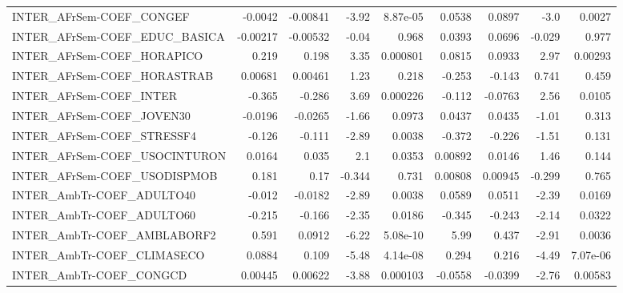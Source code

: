\begin{tabular}{lrrrrrrrr}
INTER\_AFrSem-COEF\_CONGEF              &     -0.0042 &     -0.00841 &    -3.92 & 8.87e-05 &     0.0538 &      0.0897 &         -3.0 &        0.0027 \\
INTER\_AFrSem-COEF\_EDUC\_BASICA         &    -0.00217 &     -0.00532 &    -0.04 &    0.968 &     0.0393 &      0.0696 &       -0.029 &         0.977 \\
INTER\_AFrSem-COEF\_HORAPICO            &       0.219 &        0.198 &     3.35 & 0.000801 &     0.0815 &      0.0933 &         2.97 &       0.00293 \\
INTER\_AFrSem-COEF\_HORASTRAB           &     0.00681 &      0.00461 &     1.23 &    0.218 &     -0.253 &      -0.143 &        0.741 &         0.459 \\
INTER\_AFrSem-COEF\_INTER               &      -0.365 &       -0.286 &     3.69 & 0.000226 &     -0.112 &     -0.0763 &         2.56 &        0.0105 \\
INTER\_AFrSem-COEF\_JOVEN30             &     -0.0196 &      -0.0265 &    -1.66 &   0.0973 &     0.0437 &      0.0435 &        -1.01 &         0.313 \\
INTER\_AFrSem-COEF\_STRESSF4            &      -0.126 &       -0.111 &    -2.89 &   0.0038 &     -0.372 &      -0.226 &        -1.51 &         0.131 \\
INTER\_AFrSem-COEF\_USOCINTURON         &      0.0164 &        0.035 &      2.1 &   0.0353 &    0.00892 &      0.0146 &         1.46 &         0.144 \\
INTER\_AFrSem-COEF\_USODISPMOB          &       0.181 &         0.17 &   -0.344 &    0.731 &    0.00808 &     0.00945 &       -0.299 &         0.765 \\
INTER\_AmbTr-COEF\_ADULTO40             &      -0.012 &      -0.0182 &    -2.89 &   0.0038 &     0.0589 &      0.0511 &        -2.39 &        0.0169 \\
INTER\_AmbTr-COEF\_ADULTO60             &      -0.215 &       -0.166 &    -2.35 &   0.0186 &     -0.345 &      -0.243 &        -2.14 &        0.0322 \\
INTER\_AmbTr-COEF\_AMBLABORF2           &       0.591 &       0.0912 &    -6.22 & 5.08e-10 &       5.99 &       0.437 &        -2.91 &        0.0036 \\
INTER\_AmbTr-COEF\_CLIMASECO            &      0.0884 &        0.109 &    -5.48 & 4.14e-08 &      0.294 &       0.216 &        -4.49 &      7.07e-06 \\
INTER\_AmbTr-COEF\_CONGCD               &     0.00445 &      0.00622 &    -3.88 & 0.000103 &    -0.0558 &     -0.0399 &        -2.76 &       0.00583 \\

\end{tabular}
